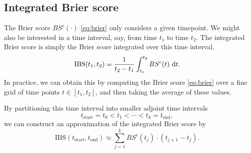 \subsection{Integrated Brier score}\label{subsec:integrated-brier}
The Brier score $BS^c(\cdot)$ \eqref{eq:brier} only considers a given timepoint.
We might also be interested in a time interval, say, from time $t_1$ to time $t_2$.
The integrated Brier score is simply the Brier score integrated over this time interval,
\begin{equation*}
    \text{IBS}(t_1, t_2)=\frac{1}{t_2-t_1}\int_{t_1}^{t_2}BS^c(t)~\text{d} t.
\end{equation*}
In practice, we can obtain this by computing the Brier score \ref{eq:brier} over a fine grid of time points $t\in[t_1,t_2]$, and then taking the average of these values.

By partitioning this time interval into smaller adjoint time intervals
\begin{equation*}
    t_{\text{start}}=t_0<t_1<\cdots<t_k=t_{\text{end}},
\end{equation*}
we can construct an approximation of the integrated Brier score by
\begin{equation*}
    \text{IBS}(t_{\text{start}}, t_{\text{end}})\approx\sum_{j=1}^k BS^c(t_j)\cdot(t_{j+1}-t_{j}).
\end{equation*}
